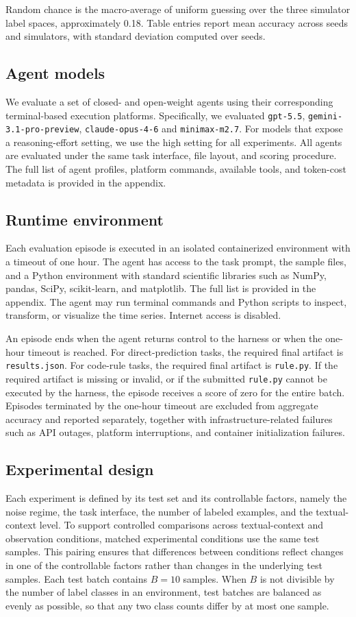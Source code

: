 Random chance is the macro-average of uniform guessing over the three simulator label spaces, approximately 0.18.
Table entries report mean accuracy across seeds and simulators, with standard deviation computed over seeds.
\subsection{Agent models}
We evaluate a set of closed- and open-weight agents using their corresponding terminal-based execution platforms.
Specifically, we evaluated \texttt{gpt-5.5}, \texttt{gemini-3.1-pro-preview}, \texttt{claude-opus-4-6} and \texttt{minimax-m2.7}.
For models that expose a reasoning-effort setting, we use the high setting for all experiments.
All agents are evaluated under the same task interface, file layout, and scoring procedure.
The full list of agent profiles, platform commands, available tools, and token-cost metadata is provided in the appendix.

\subsection{Runtime environment}
Each evaluation episode is executed in an isolated containerized environment with a timeout of one hour.
The agent has access to the task prompt, the sample files, and a Python environment with standard scientific libraries such as NumPy, pandas, SciPy, scikit-learn, and matplotlib.
The full list is provided in the appendix. 
The agent may run terminal commands and Python scripts to inspect, transform, or visualize the time series. 
Internet access is disabled.

An episode ends when the agent returns control to the harness or when the one-hour timeout is reached.
For direct-prediction tasks, the required final artifact is \texttt{results.json}.
For code-rule tasks, the required final artifact is \texttt{rule.py}.
If the required artifact is missing or invalid, or if the submitted \texttt{rule.py} cannot be executed by the harness, the episode receives a score of zero for the entire batch.
Episodes terminated by the one-hour timeout are excluded from aggregate accuracy and reported separately, together with infrastructure-related failures such as API outages, platform interruptions, and container initialization failures.

\subsection{Experimental design}
Each experiment is defined by its test set and its controllable factors, namely the noise regime, the task interface, the number of labeled examples, and the textual-context level.
To support controlled comparisons across textual-context and observation conditions, matched experimental conditions use the same test samples.
This pairing ensures that differences between conditions reflect changes in one of the controllable factors rather than changes in the underlying test samples.
Each test batch contains \(B=10\) samples. When \(B\) is not divisible by the number of label classes in an environment, test batches are balanced as evenly as possible, so that any two class counts differ by at most one sample.

